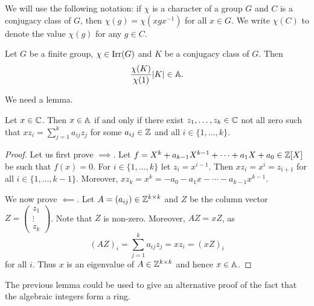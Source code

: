 \chapter{}

We will use the following notation: if $\chi$ is a character
of a group $G$ 
and $C$ is a conjugacy class of $G$, then 
$\chi(g)=\chi(xgx^{-1})$ for all $x\in G$. We write 
$\chi(C)$ to denote the value $\chi(g)$ for any $g\in C$. 

\begin{theorem}
\label{thm:B}
    Let $G$ be a finite group, $\chi\in\operatorname{Irr}(G)$ 
    and $K$ be a conjugacy class of $G$. Then 
    \[
    \frac{\chi(K)}{\chi(1)}|K|\in\mathbb{A}. 
    \]
\end{theorem}

We need a lemma. 

\begin{lemma}
    Let $x\in\mathbb{C}$. Then $x\in\mathbb{A}$ if and only if 
    there exist $z_1,\dots,z_k\in\mathbb{C}$ not all zero such that 
    $xz_i=\sum_{j=1}^ka_{ij}z_j$ for some $a_{ij}\in\mathbb{Z}$ and 
    all $i\in\{1,\dots,k\}$. 
\end{lemma}

\begin{proof}
    Let us first prove $\implies$. Let $f=X^k+a_{k-1}X^{k-1}+\cdots+a_1X+a_0\in\mathbb{Z}[X]$
    be such that $f(x)=0$. For $i\in\{1,\dots,k\}$ let 
    $z_i=x^{i-1}$. Then 
    $xz_i=x^i=z_{i+1}$ for all $i\in\{1,\dots,k-1\}$. Moreover, 
    $xz_k=x^k=-a_0-a_1x-\cdots-a_{k-1}x^{k-1}$.
    
    We now prove $\impliedby$. Let $A=(a_{ij})\in\mathbb{Z}^{k\times k}$ and 
    $Z$ be the column vector 
    $Z=\begin{pmatrix}z_1\\\vdots\\z_k\end{pmatrix}$. Note that $Z$ is non-zero. 
    Moreover, $AZ=xZ$, as 
    \[
    (AZ)_i=\sum_{j=1}^ka_{ij}z_j=xz_i=(xZ)_i
    \]
    for all $i$. Thus $x$ is an eigenvalue of $A\in\mathbb{Z}^{k\times k}$ and
    hence $x\in\mathbb{A}$. 
\end{proof}

The previous lemma could be used to give an alternative proof of the fact 
that the algebraic integers form a ring. 

